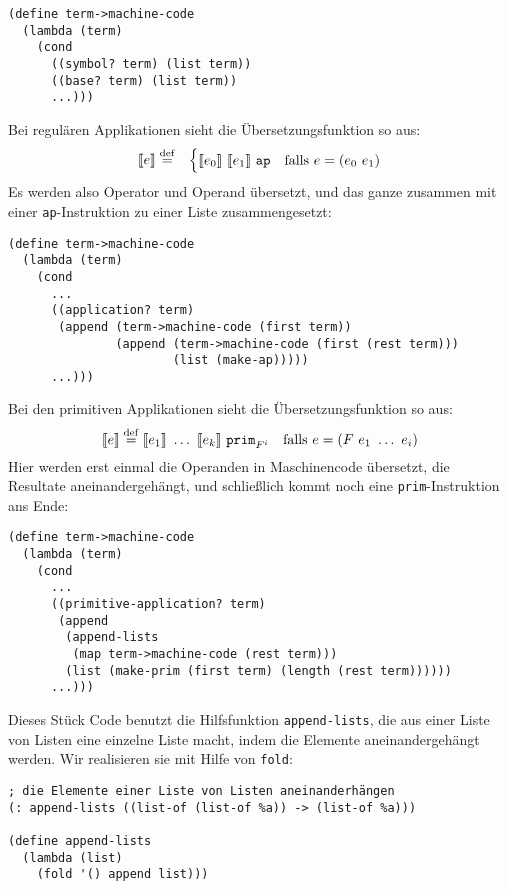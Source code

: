 %
\begin{lstlisting}
(define term->machine-code
  (lambda (term)
    (cond
      ((symbol? term) (list term))
      ((base? term) (list term))
      ...)))
\end{lstlisting}
%
Bei regulären Applikationen sieht die Übersetzungsfunktion so aus:
%
\begin{eqnarray*}
  \llbracket e \rrbracket &\stackrel{\rm def}{=}&
  \begin{cases}
    \llbracket e_0\rrbracket~\llbracket e_1\rrbracket~\mathtt{ap}
    & \textrm{falls $e = (e_0~e_1)$}\\
  \end{cases}
\end{eqnarray*}
%
Es werden also Operator und Operand übersetzt, und das ganze zusammen
mit einer \lstinline{ap}-Instruktion zu einer Liste zusammengesetzt:
%
\begin{lstlisting}
(define term->machine-code
  (lambda (term)
    (cond
      ...
      ((application? term)
       (append (term->machine-code (first term))
               (append (term->machine-code (first (rest term)))
                       (list (make-ap)))))
      ...)))
\end{lstlisting}
%
Bei den primitiven Applikationen sieht die Übersetzungsfunktion so
aus:
%
\begin{displaymath}
  \llbracket e \rrbracket \stackrel{\rm def}{=}
    \llbracket e_1\rrbracket~\ldots~\llbracket e_k\rrbracket~\mathtt{prim}_{F^i}
     \quad\textrm{falls $e = (F~e_1~\ldots~e_i)$}
\end{displaymath}
%
Hier werden erst einmal die Operanden in Maschinencode übersetzt, die
Resultate aneinandergehängt, und schließlich kommt noch eine
\lstinline{prim}-Instruktion ans Ende:
%
\begin{lstlisting}
(define term->machine-code
  (lambda (term)
    (cond
      ...
      ((primitive-application? term)
       (append
        (append-lists
         (map term->machine-code (rest term)))
        (list (make-prim (first term) (length (rest term))))))
      ...)))
\end{lstlisting}
%
Dieses Stück Code benutzt die Hilfsfunktion \lstinline{append-lists}, die
aus einer Liste von Listen eine einzelne Liste macht, indem die
Elemente aneinandergehängt werden.  Wir realisieren sie mit Hilfe von  \lstinline{fold}:
%
\begin{lstlisting}
; die Elemente einer Liste von Listen aneinanderhängen
(: append-lists ((list-of (list-of %a)) -> (list-of %a)))

(define append-lists
  (lambda (list)
    (fold '() append list)))
\end{lstlisting}
